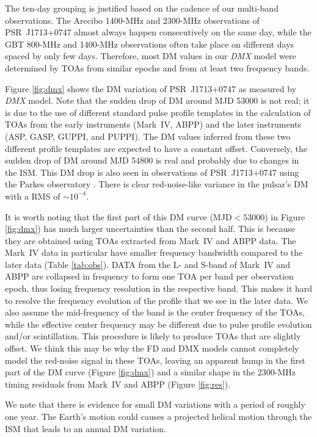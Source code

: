 The ten-day grouping is justified based on the cadence of our multi-band
observations.
The Arecibo 1400-MHz and 2300-MHz observations of PSR~J1713+0747 almost
always happen consecutively on
the same day, while the GBT 800-MHz and 1400-MHz observations often take place on different
days spaced by only few days.
Therefore, most DM values in our {\it DMX} model were determined by TOAs from
similar epochs and from at least two frequency bands. 

Figure \ref{fig:dmx} shows the DM variation of
PSR~J1713+0747 as measured by {\it DMX} model.
Note that the sudden drop of DM around MJD 53000 is not real; it is due to
the use of different standard pulse profile templates in the calculation of
TOAs from the early instruments (Mark~IV, ABPP) and the later instruments
(ASP, GASP, GUPPI, and PUPPI). The DM values inferred from these two different
profile templates are expected to have a constant offset.
Conversely, the sudden drop of DM around MJD 54800 is real and probably
due to changes in the ISM. This DM drop is also seen in observations of
PSR~J1713+0747 using the Parkes observatory \citep{kcs+13}.
There is clear red-noise-like variance in the pulsar's DM with a RMS of
$\sim10^{-4}$. 

It is worth noting that the first part of this DM curve (MJD$<53000$) in
Figure \ref{fig:dmx}) has much larger uncertainties than the second half.
This is because they are obtained using TOAs extracted from
Mark~IV and ABPP data.  The Mark~IV data in particular have smaller frequency bandwidth 
compared to the later data (Table \ref{tab:obs}).
DATA from the L- and S-band of Mark~IV and ABPP are collapsed in frequency to form one TOA per band per observation epoch, thus losing frequency resolution in the respective band. This makes it hard to
resolve the frequency evolution of the profile that we see in the later data. We
also assume the mid-frequency of the band is the center frequency 
of the TOAs, while the effective center frequency may be different due to pulse
profile evolution and/or scintillation. This procedure is likely to produce TOAs that are slightly offset. We think this may be why the FD and
DMX models cannot completely model the red-noise signal in these TOAs, leaving
an apparent hump in the first part of the DM curve (Figure \ref{fig:dmx}) and 
a similar shape in the 2300-MHz timing residuals from Mark~IV and ABPP (Figure
\ref{fig:res}).

We note that there is evidence for small DM variations with a period
of roughly one year. 
The Earth's motion could causes a projected helical motion through the ISM
that leads to an annual DM variation.

